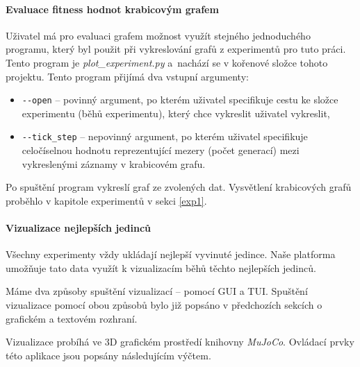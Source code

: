 \paragraph{Evaluace fitness hodnot krabicovým grafem}
Uživatel má pro evaluaci grafem možnost využít stejného jednoduchého programu,
který byl použit při vykreslování grafů z experimentů pro tuto práci. Tento
program je \emph{plot\_experiment.py} a~nachází se v kořenové složce
tohoto projektu. Tento program přijímá dva vstupní argumenty: 
\begin{itemize}
    \item \texttt{-{}-open} -- povinný argument, po kterém uživatel specifikuje
        cestu ke složce experimentu (běhů experimentu), který chce vykreslit
        uživatel vykreslit,
    \item \texttt{-{}-tick\_step} -- nepovinný argument, po kterém uživatel specifikuje
        celočíselnou hodnotu reprezentující mezery (počet generací) mezi
        vykreslenými záznamy v krabicovém grafu.
\end{itemize}
Po spuštění program vykreslí graf ze zvolených dat. Vysvětlení krabicových
grafů proběhlo v kapitole experimentů v sekci \ref{exp1}.

\paragraph{Vizualizace nejlepších jedinců}
Všechny experimenty vždy ukládají nejlepší vyvinuté jedince. Naše platforma
umožňuje tato data využít k vizualizacím běhů těchto nejlepších jedinců. 

Máme dva způsoby spuštění vizualizací -- pomocí GUI a TUI. Spuštění
vizualizace pomocí obou způsobů bylo již popsáno v předchozích sekcích o
grafickém a textovém rozhraní. 

Vizualizace probíhá ve 3D grafickém prostředí knihovny \emph{MuJoCo}. Ovládací
prvky této aplikace jsou popsány následujícím výčtem.

